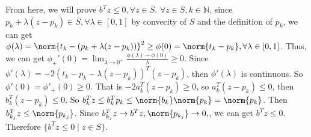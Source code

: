 \documentclass{ctexart}
\begin{document}
\begin{solution}
  From here, we will prove \(b^Tz \leq 0, \forall z \in \overline{ S} \). \(\forall z \in \overline{S}, k \in \mathbb{N}  \),
  since \(p_k + \lambda (z-p_k) \in \overline{S}, \forall \lambda \in [0,1] \) by convecity of \(S \) and the definition of \(p_k \),
  we can get  \(\phi(\lambda)= \norm{t_k -(p_k + \lambda (z-p_k))}^2 \geq \phi(0)=\norm{t_k-p_k} , \forall \lambda \in [0,1]\).
  Thus, we can get \(\phi_+'(0)=\lim_{\lambda \to 0^{+}} \frac{\phi(\lambda)-\phi(0)}{\lambda} \geq 0 \).
  Since \(\phi'(\lambda)=-2(t_k-p_k -\lambda(z-p_k))^T(z-p_k) \), then \(\phi'(\lambda) \) is continuous. So \(\phi'(0)=\phi'_+(0) \geq 0 \).
  That is \(-2a_k^T(z-p_k) \ge 0 \), so \(a_k^T(z -p_k) \leq 0 \), then \(b_k^T(z-p_k) \leq 0 \).
  So \(b_k^Tz \leq b_k^Tp_k \leq \norm{b_k}\norm{p_k}=\norm{p_k}\). Then \(b_{k_j}^Tz \leq \norm{p_{k_j}} \).
  Since \(b_{k_j}^Tz \to b^Tz, \norm{p_{k_j}} \to 0, \), we can get \(b^T z \leq 0 \).
  Therefore \(\{b^Tz \leq 0 \mid z \in S\} \).

\end{solution}
\end{document}
